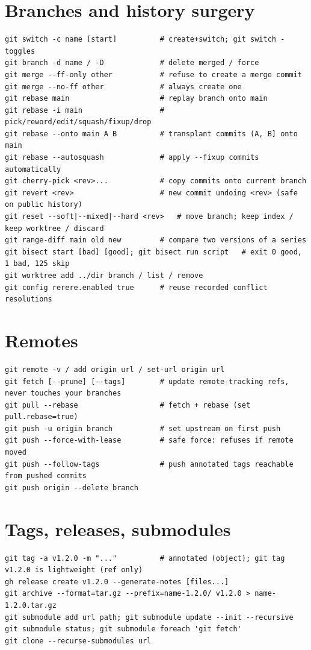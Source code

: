 \section*{Branches and history surgery}
\begin{lstlisting}[style=sh]
git switch -c name [start]          # create+switch; git switch - toggles
git branch -d name / -D             # delete merged / force
git merge --ff-only other           # refuse to create a merge commit
git merge --no-ff other             # always create one
git rebase main                     # replay branch onto main
git rebase -i main                  # pick/reword/edit/squash/fixup/drop
git rebase --onto main A B          # transplant commits (A, B] onto main
git rebase --autosquash             # apply --fixup commits automatically
git cherry-pick <rev>...            # copy commits onto current branch
git revert <rev>                    # new commit undoing <rev> (safe on public history)
git reset --soft|--mixed|--hard <rev>   # move branch; keep index / keep worktree / discard
git range-diff main old new         # compare two versions of a series
git bisect start [bad] [good]; git bisect run script   # exit 0 good, 1 bad, 125 skip
git worktree add ../dir branch / list / remove
git config rerere.enabled true      # reuse recorded conflict resolutions
\end{lstlisting}

\section*{Remotes}
\begin{lstlisting}[style=sh]
git remote -v / add origin url / set-url origin url
git fetch [--prune] [--tags]        # update remote-tracking refs, never touches your branches
git pull --rebase                   # fetch + rebase (set pull.rebase=true)
git push -u origin branch           # set upstream on first push
git push --force-with-lease         # safe force: refuses if remote moved
git push --follow-tags              # push annotated tags reachable from pushed commits
git push origin --delete branch
\end{lstlisting}

\section*{Tags, releases, submodules}
\begin{lstlisting}[style=sh]
git tag -a v1.2.0 -m "..."          # annotated (object); git tag v1.2.0 is lightweight (ref only)
gh release create v1.2.0 --generate-notes [files...]
git archive --format=tar.gz --prefix=name-1.2.0/ v1.2.0 > name-1.2.0.tar.gz
git submodule add url path; git submodule update --init --recursive
git submodule status; git submodule foreach 'git fetch'
git clone --recurse-submodules url
\end{lstlisting}

